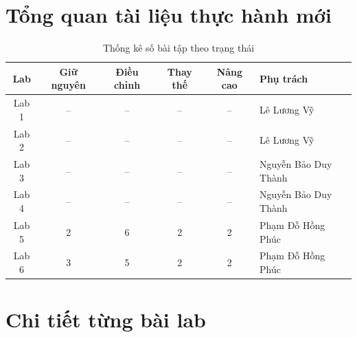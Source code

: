 \documentclass[12pt,a4paper]{article}
\newif\ifguide
\newcommand{\TVa}{Phạm Đỗ Hồng Phúc}   \newcommand{\MSa}{2510359}   \newcommand{\PTa}{-- Lab 5, Lab 6}  %
\newcommand{\TVb}{Lê Lương Vỹ}          \newcommand{\MSb}{2214056}   \newcommand{\PTb}{-- Lab 1, Lab 2}  %
\newcommand{\TVc}{Nguyễn Bảo Duy Thành} \newcommand{\MSc}{2510372}   \newcommand{\PTc}{-- Lab 3, Lab 4}  %
\newcommand{\hd}[1]{\ifguide{\par\color{guidegray}\itshape #1\par}\fi}
\newcommand{\cachlam}[2][Cách làm]{%
  \ifguide
  \begin{tcolorbox}[enhanced,breakable,colback=lightnavy,colframe=navy,boxrule=0.6pt,arc=2pt,
    left=6pt,right=6pt,top=3pt,bottom=3pt,fonttitle=\sffamily\bfseries\small,title={#1}]
  \small #2
  \end{tcolorbox}
  \fi}
\newcommand{\hc}[1]{\cellcolor{navy}\color{white}\sffamily\bfseries\small #1}
\begin{document}
\section{Tổng quan tài liệu thực hành mới}
\hd{Thống kê số bài tập theo trạng thái.}
\cachlam{Điền bảng \textbf{sau khi} hoàn thành các bảng ở mục 5. Với mỗi lab: \textbf{Giữ nguyên + Điều chỉnh + Thay thế = 10} bài chính; \textbf{Nâng cao $\geq$ 2}; cột ``Phụ trách'' ghi tên thành viên. Số liệu phải khớp với các Bảng danh sách bài tập Lab 1--6.}
\begin{table}[H]\centering\small
\caption{Thống kê số bài tập theo trạng thái}
\renewcommand{\arraystretch}{1.5}
\begin{tabular}{|c|c|c|c|c|p{3.4cm}|}
\hline
\hc{Lab} & \hc{Giữ nguyên} & \hc{Điều chỉnh} & \hc{Thay thế} & \hc{Nâng cao} & \hc{Phụ trách}\\ \hline
Lab 1 & -- & -- & -- & -- & \TVb\\ \hline
Lab 2 & -- & -- & -- & -- & \TVb\\ \hline
Lab 3 & -- & -- & -- & -- & \TVc\\ \hline
Lab 4 & -- & -- & -- & -- & \TVc\\ \hline
Lab 5 & 2 & 6 & 2 & 2 & \TVa\\ \hline
Lab 6 & 3 & 5 & 2 & 2 & \TVa\\ \hline
\end{tabular}
\end{table}

\section{Chi tiết từng bài lab}
\hd{Mỗi lab một mục con, gồm: bảng 10 bài tập (mẫu dưới đây), danh sách bài tập nâng cao, và ảnh chụp minh hoạ một bài tiêu biểu.}
\cachlam{Cách điền bảng danh sách bài tập của mỗi lab:
\begin{itemize}
  \item \textbf{Bài gốc}: tên/số mục của bài trong tài liệu PSpice (ví dụ ``Mục 3.4 Clamper'').
  \item \textbf{Bài mới (LTspice)}: tên bài mới và tên file (ví dụ \texttt{Ex04.asc}). Đặt tên file thống nhất \texttt{LabN/ExNN.asc}.
  \item \textbf{Trạng thái}: \textbf{Giữ nguyên} (chỉ đổi công cụ), \textbf{Điều chỉnh} (đổi linh kiện/giá trị nhưng giữ mục tiêu), hoặc \textbf{Thay thế} (bài tương đương mới). \textbf{Mọi thay đổi phải có lý do} -- ghi vào mục 6 (và câu [6]).
  \item \textbf{Lệnh mô phỏng}: các lệnh dùng trong bài (ví dụ \texttt{.op}, \texttt{.dc V1 0 5 10m}, \texttt{.tran 100m}, \texttt{.ac dec 20 10 1Meg}, \texttt{.step}, \texttt{.meas}).
  \item \textbf{Sai lệch LT -- MP}: sai lệch giữa lý thuyết và mô phỏng (ví dụ phần trăm sai lệch của đại lượng chính), \textbf{lấy từ lần chạy thật}.
\end{itemize}
Mỗi lab có \textbf{đúng 10 bài chính}: chương gốc nhiều hơn thì chọn lọc hoặc gộp, ít hơn thì bổ sung.}
\end{document}
